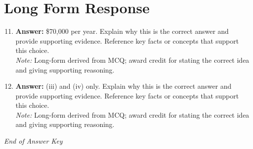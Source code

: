 \documentclass[12pt]{article}
\begin{document}
\section*{Long Form Response}
\begin{enumerate}[label=\arabic*.]
\setcounter{enumi}{10}
\item \textbf{Answer:} \$70,000 per year. Explain why this is the correct answer and provide supporting evidence. Reference key facts or concepts that support this choice.
\\ \textit{Note:} Long-form derived from MCQ; award credit for stating the correct idea and giving supporting reasoning.
\item \textbf{Answer:} (iii) and (iv) only. Explain why this is the correct answer and provide supporting evidence. Reference key facts or concepts that support this choice.
\\ \textit{Note:} Long-form derived from MCQ; award credit for stating the correct idea and giving supporting reasoning.
\end{enumerate}

\vfill
\noindent\textit{End of Answer Key}
\end{document}
